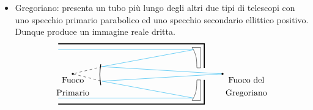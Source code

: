 \documentclass[a4paper, oneside]{book}
\begin{document}
\begin{itemize}
\begin{gather*}
\begin{tikzpicture}
            \draw[cyan](0, 1) -- (5.55, 1) -- (1.8, 0.3) -- (6.75, 0);
            \draw[cyan](0, -1) -- (5.55, -1) -- (1.8, -0.3) -- (6.75, 0);
            \draw[thick] (1.75, 0.4) arc (10:-10:2.5);
            \filldraw[align = center] (6.75, 0) circle (1pt) node[anchor = north west] {Fuoco del \\ R-C};
            \draw[dashed] (1.8, 0.3) -- (0.6, 0) -- (1.8, -0.3);
            \filldraw[align = center](0.6, 0) circle (1pt) node[anchor = north] {Fuoco \\ Primario};
        \end{tikzpicture}
    \end{gather*}
    \item Gregoriano: presenta un tubo più lungo degli altri due tipi di telescopi con uno specchio primario 
    parabolico ed uno specchio secondario ellittico positivo. Dunque produce un immagine reale dritta.
    \begin{gather*}
        \begin{tikzpicture}
            \draw[very thick](0, 1.25) -- (6, 1.25) -- (6, 0.25);
            \draw[very thick](6, -0.25) -- (6, -1.25) -- (0, -1.25);
            \draw(5.5, 1.1) -- (5.85, 1.1) -- (5.85, 0.25) -- (5.7, 0.25);
            \draw(5.5, -1.1) -- (5.85, -1.1) -- (5.85, -0.25) -- (5.7, -0.25);
            \draw(5.5, 1.1) .. controls (5.75, 0.7) and (5.67, 0.4) .. (5.7, 0.25);
            \draw(5.5, -1.1) .. controls (5.75, -0.7) and (5.67, -0.4) .. (5.7, -0.25);
            \draw[cyan](0, 1) -- (5.55, 1) -- (1.8, 0.3) -- (6.75, 0);
            \draw[cyan](0, -1) -- (5.55, -1) -- (1.8, -0.3) -- (6.75, 0);
            \draw[thick] (1.75, 0.4) arc (170:190:2.5);
            \filldraw[align = center] (6.75, 0) circle (1pt) node[anchor = north west] {Fuoco del \\ Gregoriano};
            \draw[dashed] (1.8, 0.3) -- (0.6, 0) -- (1.8, -0.3);
            \filldraw[align = center](0.6, 0) circle (1pt) node[anchor = north] {Fuoco \\ Primario};
        \end{tikzpicture}
    \end{gather*}
\end{itemize}
\end{document}
